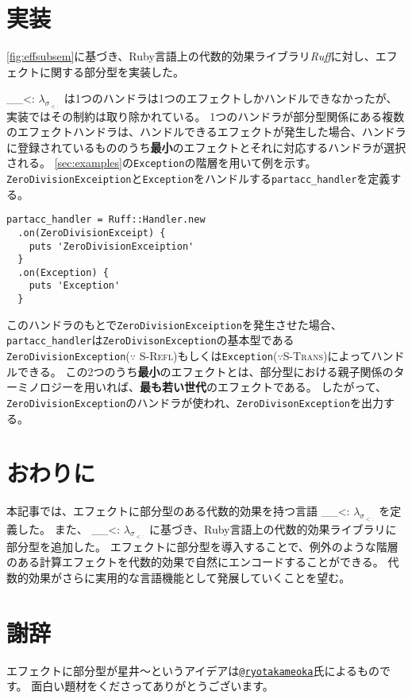 \documentclass{ltjsarticle}
\def\effsub{
  \ifmmode
    \lambda_{\sigma_{<:}}
  \else
    $\lambda_{\sigma_{<:}}$
  \fi
}
\begin{document}
\section{実装}
\autoref{fig:effsubsem}に基づき、Ruby言語上の代数的効果ライブラリ\textit{Ruff}に対し、エフェクトに関する部分型を実装した。
\effsub{}は1つのハンドラは1つのエフェクトしかハンドルできなかったが、実装ではその制約は取り除かれている。
1つのハンドラが部分型関係にある複数のエフェクトハンドラは、ハンドルできるエフェクトが発生した場合、ハンドラに登録されているもののうち\textbf{最小}のエフェクトとそれに対応するハンドラが選択される。
\autoref{sec:examples}の\texttt{Exception}の階層を用いて例を示す。
\lstinline{ZeroDivisionExceiption}と\lstinline{Exception}をハンドルする\lstinline{partacc_handler}を定義する。
\begin{lstlisting}
partacc_handler = Ruff::Handler.new
  .on(ZeroDivisionExceipt) {
    puts 'ZeroDivisionExceiption'
  }
  .on(Exception) {
    puts 'Exception'
  }
\end{lstlisting}
このハンドラのもとで\lstinline{ZeroDivisionExceiption}を発生させた場合、\lstinline{partacc_handler}は\lstinline{ZeroDivisonException}の基本型である\lstinline{ZeroDivisionException}($\because$ \textsc{S-Refl})もしくは\lstinline{Exception}($\because$\textsc{S-Trans})によってハンドルできる。
この2つのうち\textbf{最小}のエフェクトとは、部分型における親子関係のターミノロジーを用いれば、\textbf{最も若い世代}のエフェクトである。
したがって、\lstinline{ZeroDivisionException}のハンドラが使われ、\lstinline{ZeroDivisonException}を出力する。

\section{おわりに}
本記事では、エフェクトに部分型のある代数的効果を持つ言語\effsub{}を定義した。
また、\effsub{}に基づき、Ruby言語上の代数的効果ライブラリに部分型を追加した。
エフェクトに部分型を導入することで、例外のような階層のある計算エフェクトを代数的効果で自然にエンコードすることができる。
代数的効果がさらに実用的な言語機能として発展していくことを望む。

\section*{謝辞}
エフェクトに部分型が星井〜というアイデアは\href{https://twitter.com/ryotakameoka}{\texttt{@ryotakameoka}}氏によるものです。
面白い題材をくださってありがとうございます。

\printbibliography
\end{document}
